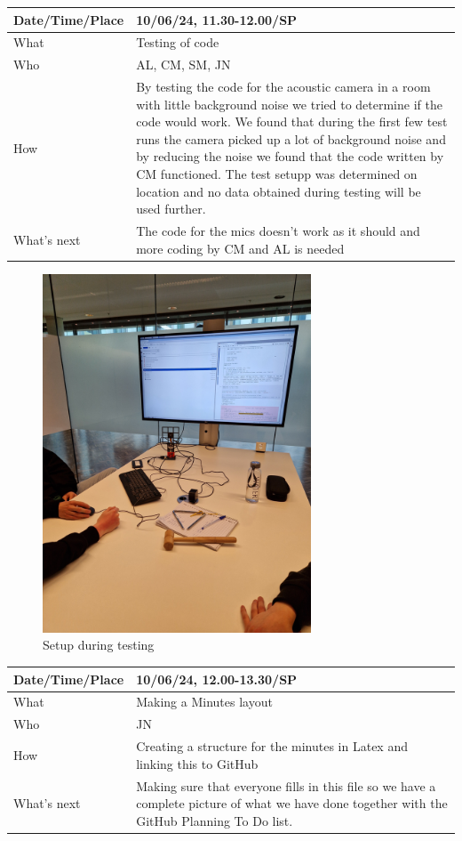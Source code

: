 \documentclass{article}
\begin{document}
\begin{table}[H]
\begin{tabular}{|p{1.5in}|p{4in}|}
\hline
Date/Time/Place & 10/06/24, 11.30-12.00/SP \\ \hline
What            &  Testing of code\\ \hline
Who             &  AL, CM, SM, JN\\ \hline
How             &  By testing the code for the acoustic camera in a room with little background noise we tried to determine if the code would work. We found that during the first few test runs the camera picked up a lot of background noise and by reducing the noise we found that the code written by CM functioned. The test setupp was determined on location and no data obtained during testing will be used further. \\ \hline
What's next     &  The code for the mics doesn't work as it should and more coding by CM and AL is needed\\ \hline
\end{tabular}
\end{table}
\begin{figure}[H]
    \centering
    \includegraphics[width=8cm, angle =270]{20240610_113743.jpg}
    \caption{Setup during testing}   
\end{figure}


\begin{table}[H]
\begin{tabular}{|p{1.5in}|p{4in}|}
\hline
Date/Time/Place &  10/06/24, 12.00-13.30/SP\\ \hline
What            &  Making a Minutes layout\\ \hline
Who             &  JN\\ \hline
How             &  Creating a structure for the minutes in Latex and linking this to GitHub\\ \hline
What's next     &  Making sure that everyone fills in this file so we have a complete picture of what we have done together with the GitHub Planning To Do list.\\ \hline
\end{tabular}
\end{table}
\end{document}
